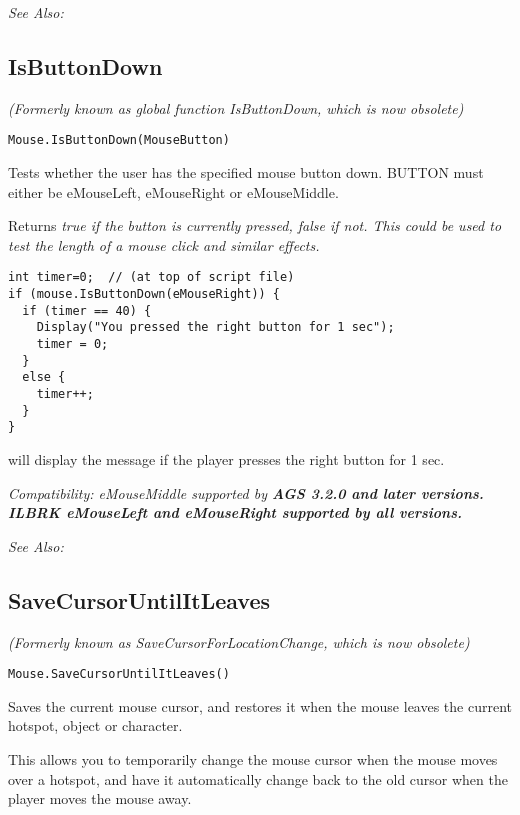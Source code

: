 \it{See Also:} 


\subsection{IsButtonDown}\label{Mouse.IsButtonDown}%

\it{(Formerly known as global function IsButtonDown, which is now obsolete)}

\begin{verbatim}
Mouse.IsButtonDown(MouseButton)
\end{verbatim}
Tests whether the user has the specified mouse button down. BUTTON must either
be eMouseLeft, eMouseRight or eMouseMiddle.

Returns \it{true} if the button is currently pressed, \it{false} if not. This could be used to
test the length of a mouse click and similar effects.

\begin{verbatim}
int timer=0;  // (at top of script file)
if (mouse.IsButtonDown(eMouseRight)) {
  if (timer == 40) {
    Display("You pressed the right button for 1 sec");
    timer = 0;
  }
  else {
    timer++;
  }
}
\end{verbatim}
will display the message if the player presses the right button for 1 sec.

\it{Compatibility:} \it{eMouseMiddle} supported by \bf{AGS 3.2.0} and later versions. ILBRK
\it{eMouseLeft} and \it{eMouseRight} supported by all versions.

\it{See Also:} 


\subsection{SaveCursorUntilItLeaves}\label{Mouse.SaveCursorUntilItLeaves}%

\it{(Formerly known as SaveCursorForLocationChange, which is now obsolete)}

\begin{verbatim}
Mouse.SaveCursorUntilItLeaves()
\end{verbatim}
Saves the current mouse cursor, and restores it when the mouse leaves the current hotspot,
object or character.

This allows you to temporarily change the mouse cursor when the mouse moves over a hotspot,
and have it automatically change back to the old cursor when the player moves the mouse away.


